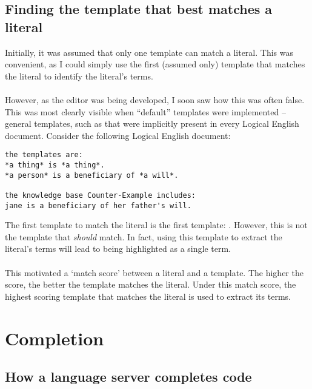 \documentclass[../main.tex]{subfiles}
\begin{document}
\subsection{Finding the template that best matches a literal}
Initially, it was assumed that only one template can match a literal. This was convenient, as I could simply use the first (assumed only) template that matches the literal to identify the literal's terms. 
\\
\\
However, as the editor was being developed, I soon saw how this was often false. This was most clearly visible when ``default'' templates were implemented -- general templates, such as  that were implicitly present in every Logical English document. Consider the following Logical English document:
\begin{lstlisting}[language={LE}]
the templates are:
*a thing* is *a thing*.
*a person* is a beneficiary of *a will*.

the knowledge base Counter-Example includes:
jane is a beneficiary of her father's will.
\end{lstlisting}
The first template to match the literal  is the first template: . However, this is not the template that \textit{should} match. In fact, using this template to extract the literal's terms will lead to  being highlighted as a single term.
\\ 
\\
This motivated a `match score' between a literal and a template. The higher the score, the better the template matches the literal.
Under this match score, the highest scoring template that matches the literal is used to extract its terms.
%
%
%
\section{Completion}
\subsection{How a language server completes code}
\end{document}
